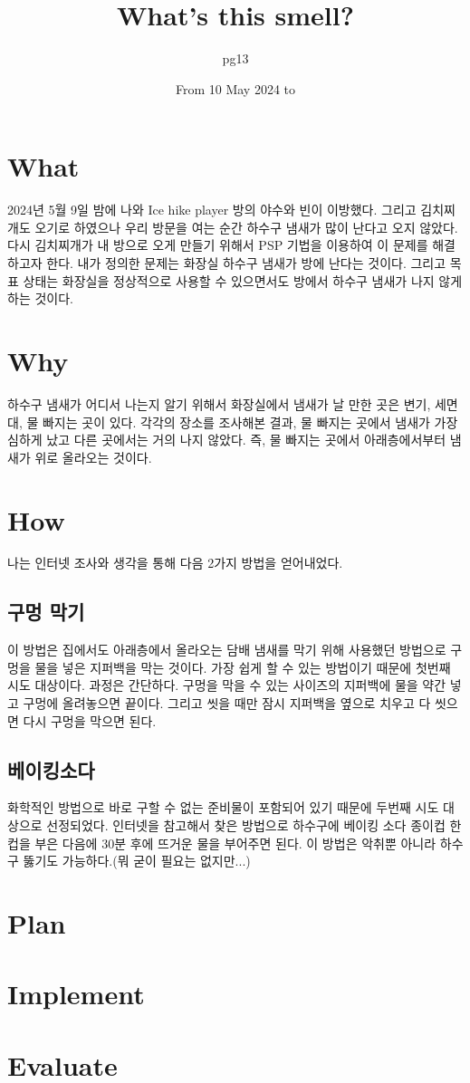 \documentclass{article}
\title{What's this smell?}
\author{pg13}
\date{From 10 May 2024 to }
\begin{document}
\maketitle

\section{What}
2024년 5월 9일 밤에 나와 Ice hike player 방의 야수와 빈이 이방했다. 
그리고 김치찌개도 오기로 하였으나 우리 방문을 여는 순간 하수구 냄새가 많이 난다고 오지 않았다.
다시 김치찌개가 내 방으로 오게 만들기 위해서 PSP 기법을 이용하여 이 문제를 해결하고자 한다.
내가 정의한 문제는 화장실 하수구 냄새가 방에 난다는 것이다. 
그리고 목표 상태는 화장실을 정상적으로 사용할 수 있으면서도 방에서 하수구 냄새가 나지 않게 하는 것이다.

\section{Why}
하수구 냄새가 어디서 나는지 알기 위해서 화장실에서 냄새가 날 만한 곳은 변기, 세면대, 물 빠지는 곳이 있다.
각각의 장소를 조사해본 결과, 물 빠지는 곳에서 냄새가 가장 심하게 났고 다른 곳에서는 거의 나지 않았다.
즉, 물 빠지는 곳에서 아래층에서부터 냄새가 위로 올라오는 것이다.

\section{How}
나는 인터넷 조사와 생각을 통해 다음 2가지 방법을 얻어내었다.
\subsection{구멍 막기}
이 방법은 집에서도 아래층에서 올라오는 담배 냄새를 막기 위해 사용했던 방법으로 구멍을 물을 넣은 지퍼백을 막는 것이다.
가장 쉽게 할 수 있는 방법이기 때문에 첫번째 시도 대상이다.
과정은 간단하다.
구멍을 막을 수 있는 사이즈의 지퍼백에 물을 약간 넣고 구멍에 올려놓으면 끝이다.
그리고 씻을 때만 잠시 지퍼백을 옆으로 치우고 다 씻으면 다시 구멍을 막으면 된다.
\subsection{베이킹소다}
화학적인 방법으로 바로 구할 수 없는 준비물이 포함되어 있기 때문에 두번째 시도 대상으로 선정되었다.
인터넷을 참고해서 찾은 방법으로 하수구에 베이킹 소다 종이컵 한 컵을 부은 다음에 30분 후에 뜨거운 물을 부어주면 된다.
이 방법은 악취뿐 아니라 하수구 뚫기도 가능하다.(뭐 굳이 필요는 없지만...)

\section{Plan}

\section{Implement}

\section{Evaluate}
\end{document}
